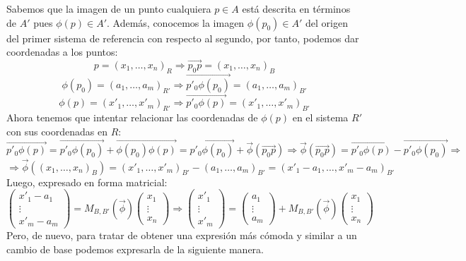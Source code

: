 \documentclass[10pt,a4paper,openright]{book}
\theoremstyle{break}
\begin{document}
Sabemos que la imagen de un punto cualquiera $p \in A$ está descrita en términos de $A'$ pues $\phi(p) \in A'$. Además, conocemos la imagen $\phi(p_0) \in A'$ del origen del primer sistema de referencia con respecto al segundo, por tanto, podemos dar coordenadas a los puntos:
$$p = (x_1, \ldots, x_n )_R\Rightarrow\vec{p_0 p} = (x_1, \ldots, x_n)_B$$
$$\phi(p_0) = (a_1, \ldots, a_m)_{R'}\Rightarrow\overrightarrow{p'_0 \phi(p_0)} =(a_1, \ldots, a_m)_{B'} $$
$$\phi(p) = (x'_1, \ldots, x'_m)_{R'}\Rightarrow\overrightarrow{p'_0 \phi(p)} =(x'_1, \ldots, x'_m)_{B'} $$
Ahora tenemos que intentar relacionar las coordenadas de $\phi(p)$ en el sistema $R'$ con sus coordenadas en $R$:
$$ \overrightarrow{p'_0 \phi(p)} = \overrightarrow{p'_0 \phi(p_0)} +  \overrightarrow{\phi(p_0) \phi(p)} = \overrightarrow{p'_0 \phi(p_0)} + \vec{\phi} (\vec{p_0 p}) \Rightarrow \vec{\phi} (\vec{p_0 p}) = \overrightarrow{p'_0 \phi(p)} -  \overrightarrow{p'_0 \phi(p_0)} \Rightarrow$$
$$\Rightarrow \vec{\phi}((x_1, \ldots, x_n)_B) = (x'_1, \ldots, x'_m)_{B'} - (a_1, \ldots, a_m)_{B'}  = (x'_1 - a_1, \ldots, x'_m - a_m)_{B'} $$
Luego, expresado en forma matricial:
$$\begin{pmatrix}
x'_1 - a_1 \\ \vdots \\ x'_m - a_m
\end{pmatrix}
= M_{B, B'} (\vec{\phi}) \begin{pmatrix}
x_1 \\ \vdots \\ x_n
\end{pmatrix} \Rightarrow \begin{pmatrix}
x'_1 \\ \vdots \\ x'_m
\end{pmatrix} = \begin{pmatrix}
a_1 \\ \vdots \\ a_m
\end{pmatrix}+ M_{B, B'} (\vec{\phi}) \begin{pmatrix}
x_1 \\ \vdots \\ x_n
\end{pmatrix}
$$
Pero, de nuevo, para tratar de obtener una expresión más cómoda y similar a un cambio de base podemos expresarla de la siguiente manera.
\end{document}
